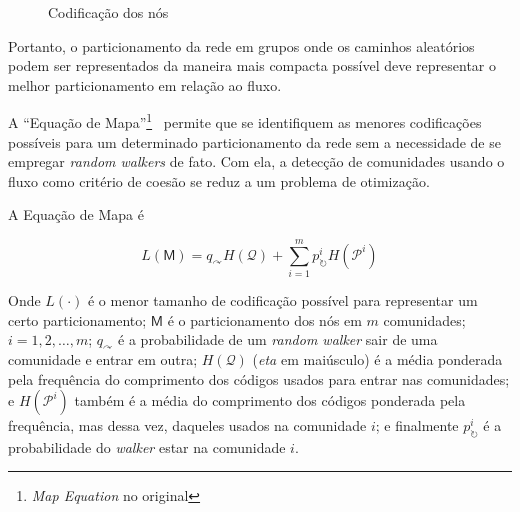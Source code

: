 \documentclass[
  article,
  11pt,
  a4paper,
  english,
  brazil,
  sumario=tradicional]{abntex2}
\begin{document}
\begin{figure}[ht]
  \centering
  \caption{Codificação dos nós}
\end{figure}

Portanto, o particionamento da rede em grupos onde os caminhos aleatórios podem ser representados da maneira mais compacta possível deve representar o melhor particionamento em relação ao fluxo.

A \enquote{Equação de Mapa}\footnote{\textit{Map Equation} no original}~\cite{Rosvall2009-sd} permite que se identifiquem as menores codificações possíveis para um determinado particionamento da rede sem a necessidade de se empregar \textit{random walkers} de fato. Com ela, a detecção de comunidades usando o fluxo como critério de coesão se reduz a um problema de otimização.

A Equação de Mapa é

\begin{equation*}
  L(\mathsf{M}) = q_\curvearrowright H(\mathcal{Q}) + \sum_{i=1}^{m}p^i_\circlearrowright H(\mathcal{P}^i)
\end{equation*}

Onde $L(\cdot)$ é o menor tamanho de codificação possível para representar um certo particionamento; $\mathsf{M}$ é o particionamento dos nós em $m$ comunidades; $i = 1, 2, \ldots, m$; $q_\curvearrowright$ é a probabilidade de um \textit{random walker} sair de uma comunidade e entrar em outra; $H(\mathcal{Q})$ (\textit{eta} em maiúsculo) é a média ponderada pela frequência do comprimento dos códigos usados para entrar nas comunidades; e $H(\mathcal{P}^i)$ também é a média do comprimento dos códigos ponderada pela frequência, mas dessa vez, daqueles usados na comunidade $i$; e finalmente $p^i_\circlearrowright$ é a probabilidade do \textit{walker} estar na comunidade $i$.
\end{document}
